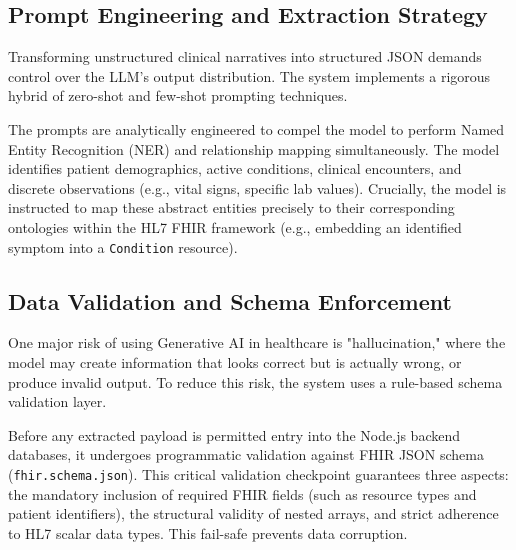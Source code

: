 \subsection{Prompt Engineering and Extraction Strategy}
\label{subsec:prompt_engineering}

Transforming unstructured clinical narratives into structured JSON demands control over the LLM's output distribution. The system implements a rigorous hybrid of zero-shot and few-shot prompting techniques. 

The prompts are analytically engineered to compel the model to perform Named Entity Recognition (NER) and relationship mapping simultaneously. The model identifies patient demographics, active conditions, clinical encounters, and discrete observations (e.g., vital signs, specific lab values). Crucially, the model is instructed to map these abstract entities precisely to their corresponding ontologies within the HL7 FHIR framework (e.g., embedding an identified symptom into a \texttt{Condition} resource).

\subsection{Data Validation and Schema Enforcement}
\label{subsec:mapper_validation}

One major risk of using Generative AI in healthcare is "hallucination," where the model may create information that looks correct but is actually wrong, or produce invalid output. To reduce this risk, the system uses a rule-based schema validation layer. 

Before any extracted payload is permitted entry into the Node.js backend databases, it undergoes  programmatic validation against FHIR JSON schema (\texttt{fhir.schema.json}). This critical validation checkpoint guarantees three aspects: the mandatory inclusion of required FHIR fields (such as resource types and patient identifiers), the structural validity of nested arrays, and strict adherence to HL7 scalar data types. This fail-safe prevents data corruption.

